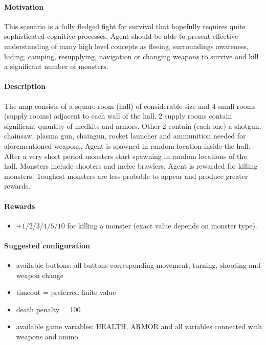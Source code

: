 \documentclass[english,bachelor,a4paper,twoside]{ppfcmthesis}
\begin{document}
		\paragraph{Motivation} 
	 		This scenario is a fully fledged fight for survival that hopefully requires quite sophisticated cognitive processes. Agent should be able to present effective understanding of many high level concepts as fleeing, surroundings awareness, hiding, camping, resupplying, navigation or changing weapons to survive and kill a significant number of monsters.

		\paragraph{Description}
			The map consists of a square room (hall) of considerable size and 4 small rooms (supply rooms) adjacent to each wall of the hall. 2 supply rooms contain significant quantity of medkits and armors. Other 2 contain (each one) a shotgun, chainsaw, plasma gun, chaingun, rocket launcher and ammunition needed for aforementioned weapons. Agent is spawned in random location inside the hall. After a very short period monsters start spawning in random locations of the hall. Monsters include shooters and melee brawlers. Agent is rewarded for killing monsters. Toughest monsters are less probable to appear and produce greater rewards.
		\paragraph{Rewards}
			\begin{itemize}
				\item $+1/2/3/4/5/10$ for killing a monster (exact value depends on monster type).
			\end{itemize}
		
		\paragraph{Suggested configuration}
			\begin{itemize}
				\item available buttons: all buttons corresponding movement, turning, shooting and weapon change 
				\item timeout = preferred finite value
				\item death penalty = 100
				\item available game variables: HEALTH, ARMOR and all variables connected with weapons and ammo
			\end{itemize}		
	\newpage
\end{document}
